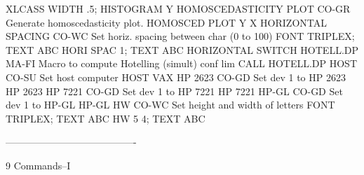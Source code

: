                                   XLCASS WIDTH .5; HISTOGRAM Y
HOMOSCEDASTICITY PLOT       CO-GR Generate homoscedasticity plot.
                                  HOMOSCED PLOT Y X
HORIZONTAL SPACING          CO-WC Set horiz. spacing between char (0 to 100)
                                  FONT TRIPLEX; TEXT ABC
                                  HORI SPAC 1; TEXT ABC
HORIZONTAL SWITCH
HOTELL.DP                   MA-FI Macro to compute Hotelling (simult) conf lim
                                  CALL HOTELL.DP
HOST                        CO-SU Set host computer
                                  HOST VAX
HP 2623                     CO-GD Set dev 1 to HP 2623
                                  HP 2623
HP 7221                     CO-GD Set dev 1 to HP 7221
                                  HP 7221
HP-GL                       CO-GD Set dev 1 to HP-GL
                                  HP-GL
HW                          CO-WC Set height and width of letters
                                  FONT TRIPLEX; TEXT ABC
                                  HW 5 4; TEXT ABC
 
----------------------------------------
 
9
Commands--I
 
